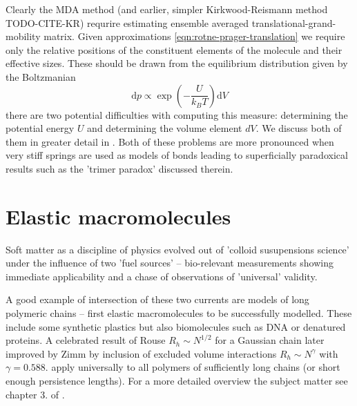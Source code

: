 \documentclass{doctoral}
\newcommand{\dd}{\mathrm{d}}
\begin{document}
Clearly the MDA method (and earlier, simpler Kirkwood-Reismann method TODO-CITE-KR) requrire estimating ensemble averaged translational-grand-mobility matrix.
Given approximations \eqref{eqn:rotne-prager-translation} we require only the relative positions of the constituent elements of the molecule and their effective sizes.
These should be drawn from the equilibrium distribution given by the Boltzmanian
\begin{equation}
    \dd p \propto \exp \left(- \frac{U}{k_B T} \right) \dd V
\end{equation}
there are two potential difficulties with computing this measure: determining the potential energy $U$ and determining the volume element $dV$.
We discuss both of them in greater detail in \textcite{Waszkiewicz_2024_trimer}.
Both of these problems are more pronounced when very stiff springs are used as models of bonds leading to superficially paradoxical results such as the 'trimer paradox' discussed therein.

\section{Elastic macromolecules}

Soft matter as a discipline of physics evolved out of 'colloid susupensions science' under the influence of two 'fuel sources' -- bio-relevant measurements showing immediate applicability and a chase of observations of 'universal' validity.

A good example of intersection of these two currents are models of long polymeric chains -- first elastic macromolecules to be successfully modelled.
These include some synthetic plastics but also biomolecules such as DNA or denatured proteins.
A celebrated result of Rouse $R_h \sim N^{1/2}$ for a Gaussian chain\cite{Rouse_1953} later improved by Zimm by inclusion of excluded volume interactions \cite{Zimm_1956} $R_h \sim N^\gamma$ with $\gamma=0.588$.
apply universally to all polymers of sufficiently long chains (or short enough persistence lengths).
For a more detailed overview the subject matter see chapter 3.
of \textcite{Dhont_2008}.



\end{document}
